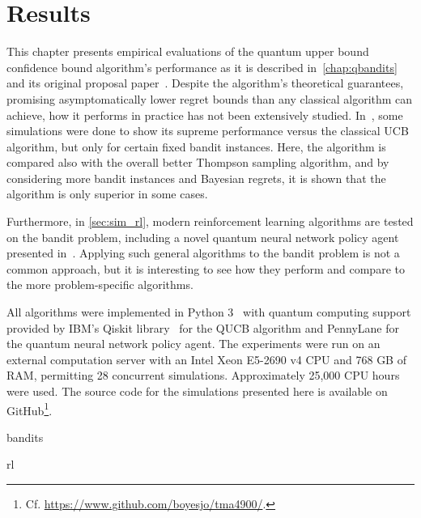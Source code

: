 \chapter{Results}
\label{chap:simulations}

This chapter presents empirical evaluations of the quantum upper bound confidence bound algorithm's performance as it is described in~\cref{chap:qbandits} and its original proposal paper~\autocite{wan2022}.
Despite the algorithm's theoretical guarantees, promising asymptomatically lower regret bounds than any classical algorithm can achieve, how it performs in practice has not been extensively studied.
In~\autocite{wan2022}, some simulations were done to show its supreme performance versus the classical UCB algorithm, but only for certain fixed bandit instances.
Here, the algorithm is compared also with the overall better Thompson sampling algorithm, and by considering more bandit instances and Bayesian regrets, it is shown that the algorithm is only superior in some cases.

Furthermore, in \cref{sec:sim_rl}, modern reinforcement learning algorithms are tested on the bandit problem, including a novel quantum neural network policy agent presented in~\autocite{jerbi2021a}.
Applying such general algorithms to the bandit problem is not a common approach, but it is interesting to see how they perform and compare to the more problem-specific algorithms.

All algorithms were implemented in Python 3~\autocite{python} with quantum computing support provided by IBM's Qiskit library~\autocite{qiskit} for the QUCB algorithm and PennyLane for the quantum neural network policy agent.
The experiments were run on an external computation server with an Intel Xeon E5-2690 v4 CPU and 768 GB of RAM, permitting 28 concurrent simulations.
Approximately 25,000 CPU hours were used.
The source code for the simulations presented here is available on GitHub\footnote{
    Cf. \url{https://www.github.com/boyesjo/tma4900/}.
}.



{bandits}
\clearpage



{rl}

\clearpage
